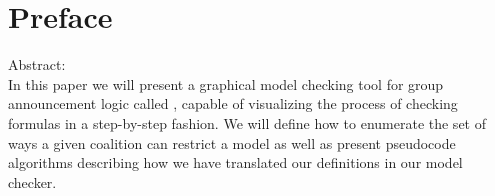 \section{Preface}

Abstract: \\
In this paper we will present a graphical model checking tool for group announcement logic called \cname, capable of visualizing the process of checking formulas in a step-by-step fashion. We will define how to enumerate the set of ways a given coalition can restrict a model as well as present pseudocode algorithms describing how we have translated our definitions in our model checker. 

